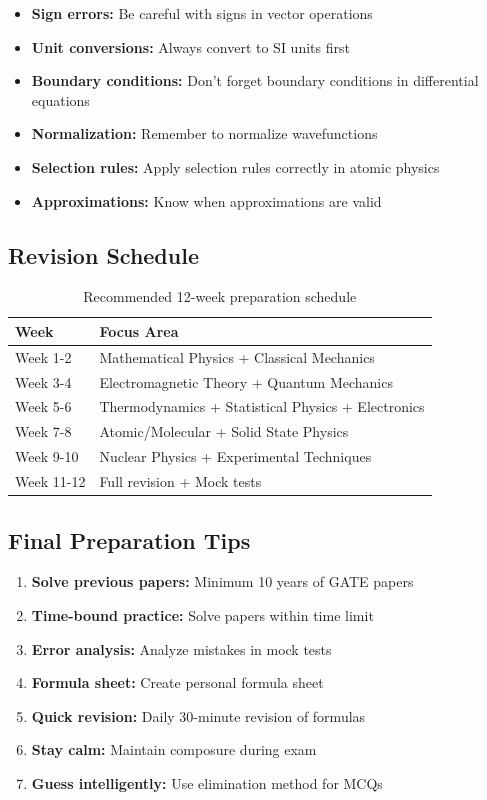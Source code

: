 \documentclass[12pt,a4paper]{article}
\begin{document}
\begin{itemize}
\item \textbf{Sign errors:} Be careful with signs in vector operations
\item \textbf{Unit conversions:} Always convert to SI units first
\item \textbf{Boundary conditions:} Don't forget boundary conditions in differential equations
\item \textbf{Normalization:} Remember to normalize wavefunctions
\item \textbf{Selection rules:} Apply selection rules correctly in atomic physics
\item \textbf{Approximations:} Know when approximations are valid
\end{itemize}

\subsection{Revision Schedule}

\begin{table}[h]
\centering
\begin{tabular}{@{}ll@{}}
\toprule
\textbf{Week} & \textbf{Focus Area} \\
\midrule
Week 1-2 & Mathematical Physics + Classical Mechanics \\
Week 3-4 & Electromagnetic Theory + Quantum Mechanics \\
Week 5-6 & Thermodynamics + Statistical Physics + Electronics \\
Week 7-8 & Atomic/Molecular + Solid State Physics \\
Week 9-10 & Nuclear Physics + Experimental Techniques \\
Week 11-12 & Full revision + Mock tests \\
\bottomrule
\end{tabular}
\caption{Recommended 12-week preparation schedule}
\end{table}

\subsection{Final Preparation Tips}

\begin{enumerate}
\item \textbf{Solve previous papers:} Minimum 10 years of GATE papers
\item \textbf{Time-bound practice:} Solve papers within time limit
\item \textbf{Error analysis:} Analyze mistakes in mock tests
\item \textbf{Formula sheet:} Create personal formula sheet
\item \textbf{Quick revision:} Daily 30-minute revision of formulas
\item \textbf{Stay calm:} Maintain composure during exam
\item \textbf{Guess intelligently:} Use elimination method for MCQs
\end{enumerate}
\end{document}
